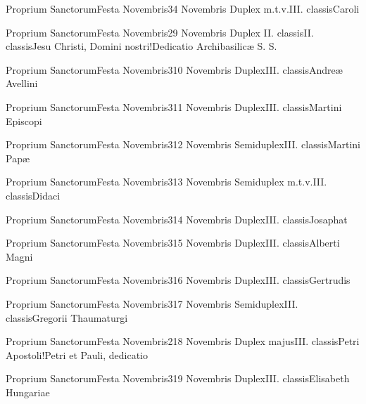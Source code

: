\documentclass[psalterium-feriale.tex]{subfiles}
\begin{document}
	{Proprium Sanctorum}{Festa Novembris}{3}{4 Novembris}
	{Duplex m.t.v.}{III. classis}{Caroli}
	{}
	{}
\COPObRubric

	{Proprium Sanctorum}{Festa Novembris}{2}{9 Novembris}
	{Duplex II. classis}{II. classis}{Jesu Christi, Domini nostri!Dedicatio Archibasilicæ S. S.\linebreak\null}
	{}
	{}
\psalmodiapropria

	{Proprium Sanctorum}{Festa Novembris}{3}{10 Novembris}
	{Duplex}{III. classis}{Andreæ Avellini}
	{}
	{}
\COPObRubric

	{Proprium Sanctorum}{Festa Novembris}{3}{11 Novembris}
	{Duplex}{III. classis}{Martini Episcopi}
	{}
	{}
\psalmodiapropria

	{Proprium Sanctorum}{Festa Novembris}{3}{12 Novembris}
	{Semiduplex}{III. classis}{Martini Papæ}
	{}
	{}
\UMEXaRubric

	{Proprium Sanctorum}{Festa Novembris}{3}{13 Novembris}
	{Semiduplex m.t.v.}{III. classis}{Didaci}
	{}
	{}
\COPOaRubric

	{Proprium Sanctorum}{Festa Novembris}{3}{14 Novembris}
	{Duplex}{III. classis}{Josaphat}
	{}
	{}
\UMEXbRubric

	{Proprium Sanctorum}{Festa Novembris}{3}{15 Novembris}
	{Duplex}{III. classis}{Alberti Magni}
	{}
	{}
\COPOcRubric

	{Proprium Sanctorum}{Festa Novembris}{3}{16 Novembris}
	{Duplex}{III. classis}{Gertrudis}
	{}
	{}
\MUVNbRubric

	{Proprium Sanctorum}{Festa Novembris}{3}{17 Novembris}
	{Semiduplex}{III. classis}{Gregorii Thaumaturgi}
	{}
	{}
\COPOaRubric

	{Proprium Sanctorum}{Festa Novembris}{2}{18 Novembris}
	{Duplex majus}{III. classis}{Petri Apostoli!Petri et Pauli, dedicatio}
	{\psalmodiapropria}
	{\CDEDRubric}

	{Proprium Sanctorum}{Festa Novembris}{3}{19 Novembris}
	{Duplex}{III. classis}{Elisabeth Hungariae}
	{}
	{}
\MUNNaRubric
\end{document}
